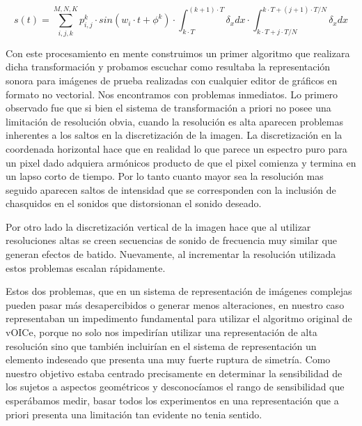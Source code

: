 \documentclass{article}
\begin{document}
    \begin{equation}
        \label{ec:VoiceOriginal}
        s(t) = \sum_{i,j,k}^{M,N,K} p_{i,j}^k \cdot sin(w_i \cdot t + \phi^k) \cdot \int_{k \cdot T}^{(k+1) \cdot T} \delta_x dx \cdot \int_{k \cdot T+j \cdot T/N}^{k \cdot T + (j+1) \cdot T/N} \delta_x dx
    \end{equation}

    Con este procesamiento en mente construimos un primer algoritmo que realizara dicha transformación y probamos escuchar como resultaba la representación sonora para imágenes de prueba realizadas con cualquier editor de gráficos en formato no vectorial. Nos encontramos con problemas inmediatos. Lo primero observado fue que si bien el sistema de transformación a priori no posee una limitación de resolución obvia, cuando la resolución es alta aparecen problemas inherentes a los saltos en la discretización de la imagen. La discretización en la coordenada horizontal hace que en realidad lo que parece un espectro puro para un pixel dado adquiera armónicos producto de que el pixel comienza y termina en un lapso corto de tiempo. Por lo tanto cuanto mayor sea la resolución mas seguido aparecen saltos de intensidad que se corresponden con la inclusión de chasquidos en el sonidos que distorsionan el sonido deseado. 
    
    Por otro lado la discretización vertical de la imagen hace que al utilizar resoluciones altas se creen secuencias de sonido de frecuencia muy similar que generan efectos de batido. Nuevamente, al incrementar la resolución utilizada estos problemas escalan rápidamente. 
    
    Estos dos problemas, que en un sistema de representación de imágenes complejas pueden pasar más desapercibidos o generar menos alteraciones, en nuestro caso representaban un impedimento fundamental para utilizar el algoritmo original de vOICe, porque no solo nos impedirían utilizar una representación de alta resolución sino que también incluirían en el sistema de representación un elemento indeseado que presenta una muy fuerte ruptura de simetría. Como nuestro objetivo estaba centrado precisamente en determinar la sensibilidad de los sujetos a aspectos geométricos y desconocíamos el rango de sensibilidad que esperábamos medir, basar todos los experimentos en una representación que a priori presenta una limitación tan evidente no tenia sentido. 
    
\end{document}
